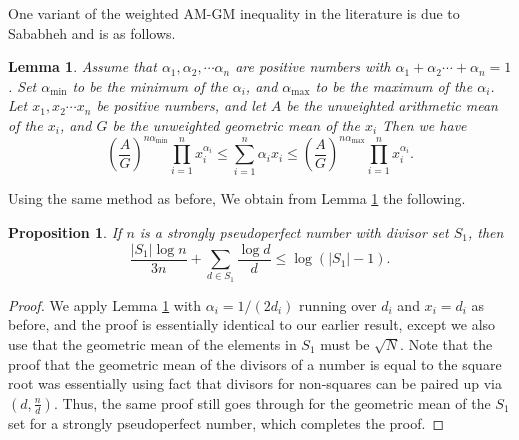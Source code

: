 \documentclass{article}
\newtheorem{lemma}[theorem]{Lemma}
\newtheorem{proposition}[theorem]{Proposition}
\begin{document}


One variant of the weighted AM-GM inequality in the literature is due to Sababheh \cite{Sababheh} and is as follows. 

\begin{lemma} Assume that $\alpha_1, \alpha_2, \cdots \alpha_n$ are positive numbers with $\alpha_1 + \alpha_2 \cdots +\alpha_n=1$. Set $\alpha_{\mathrm{min}}$ to be the minimum of the $\alpha_i$, and $\alpha_{\mathrm{max}}$ to be the maximum of the $\alpha_i$. Let $x_1, x_2 \cdots x_n$ be positive numbers, and let $A$ be the unweighted arithmetic mean of the $x_i$, and $G$ be the unweighted geometric mean of the $x_i$ Then we have  \label{Sababheh's First Lemma}
\begin{equation} \label{Sababhe's first inequality}
\left(\frac{A}{G}\right)^{n\alpha_{\mathrm{min}}} \prod_{i=1}^n x_i^{\alpha_i} \leq \sum_{i=1}^n \alpha_i x_i \leq \left(\frac{A}{G}\right)^{n\alpha_{\mathrm{max}}} \prod_{i=1}^n x_i^{\alpha_i} .
\end{equation}
\end{lemma}

Using the same method as before, We obtain from Lemma \ref{Sababheh's First Lemma} the following.

\begin{proposition} If $n$ is a strongly pseudoperfect number with divisor set $S_1$, then $$\frac{|S_1|\log n}{3n} +\sum_{d \in S_1}  \frac{\log d}{d} \leq\log (|S_1|-1).$$ \label{strongly pseudoperfect using Sababheh}
\end{proposition}
\begin{proof}  We apply Lemma \ref{Sababheh's First Lemma} with $\alpha_i=1/(2d_i)$ running over $d_i$ and $x_i =d_i$ as before, and the proof is essentially identical to our earlier result, except we also use that the geometric mean of the elements in $S_1$ must be $\sqrt{N}$. Note that the proof that the geometric mean of the divisors of a number is equal to the square root was essentially using fact that divisors for non-squares can be paired up via $(d,\frac{n}{d})$. Thus, the same proof still goes through for the geometric mean of the $S_1$ set for a strongly pseudoperfect number, which completes the proof.
\end{proof}
\end{document}

